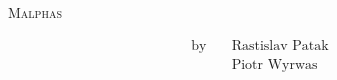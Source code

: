 \thispagestyle{plain}
\vspace*{\fill}
\begin{center}
	\Huge \textsc{Malphas} \\[.25\baselineskip]
\end{center}
\large \begin{align*}
	\text{by} \quad &\text{Rastislav Patak} \\
			&\text{Piotr Wyrwas}
\end{align*}
\vspace*{\fill}
